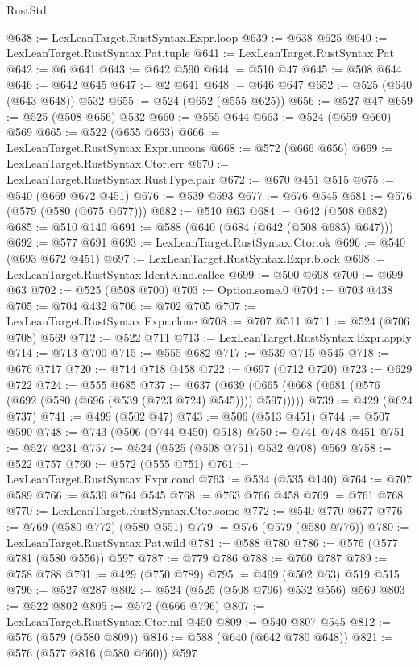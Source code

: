 \begin{lexlean}{RustStd}
\begin{coremodule}
@638 := LexLeanTarget.RustSyntax.Expr.loop
@639 := @638 @625
@640 := LexLeanTarget.RustSyntax.Pat.tuple
@641 := LexLeanTarget.RustSyntax.Pat
@642 := @6 @641
@643 := @642 @590
@644 := @510 @47
@645 := @508 @644
@646 := @642 @645
@647 := @2 @641
@648 := @646 @647
@652 := @525 (@640 (@643 @648)) @532
@655 := @524 (@652 (@555 @625))
@656 := @527 @47
@659 := @525 (@508 @656) @532
@660 := @555 @644
@663 := @524 (@659 @660) @569
@665 := @522 (@655 @663)
@666 := LexLeanTarget.RustSyntax.Expr.uncons
@668 := @572 (@666 @656)
@669 := LexLeanTarget.RustSyntax.Ctor.err
@670 := LexLeanTarget.RustSyntax.RustType.pair
@672 := @670 @451 @515
@675 := @540 (@669 @672 @451)
@676 := @539 @593
@677 := @676 @545
@681 := @576 (@579 (@580 (@675 @677)))
@682 := @510 @63
@684 := @642 (@508 @682)
@685 := @510 @140
@691 := @588 (@640 (@684 (@642 (@508 @685) @647)))
@692 := @577 @691
@693 := LexLeanTarget.RustSyntax.Ctor.ok
@696 := @540 (@693 @672 @451)
@697 := LexLeanTarget.RustSyntax.Expr.block
@698 := LexLeanTarget.RustSyntax.IdentKind.callee
@699 := @500 @698
@700 := @699 @63
@702 := @525 (@508 @700)
@703 := Option.some.{0}
@704 := @703 @438
@705 := @704 @432
@706 := @702 @705
@707 := LexLeanTarget.RustSyntax.Expr.clone
@708 := @707 @511
@711 := @524 (@706 @708) @569
@712 := @522 @711
@713 := LexLeanTarget.RustSyntax.Expr.apply
@714 := @713 @700
@715 := @555 @682
@717 := @539 @715 @545
@718 := @676 @717
@720 := @714 @718 @458
@722 := @697 (@712 @720)
@723 := @629 @722
@724 := @555 @685
@737 := @637 (@639 (@665 (@668 (@681 (@576 (@692 (@580 (@696 (@539 (@723 @724) @545)))) @597)))))
@739 := @429 (@624 @737)
@741 := @499 (@502 @47)
@743 := @506 (@513 @451)
@744 := @507 @590
@748 := @743 (@506 (@744 @450) @518)
@750 := @741 @748 @451
@751 := @527 @231
@757 := @524 (@525 (@508 @751) @532 @708) @569
@758 := @522 @757
@760 := @572 (@555 @751)
@761 := LexLeanTarget.RustSyntax.Expr.cond
@763 := @534 (@535 @140)
@764 := @707 @589
@766 := @539 @764 @545
@768 := @763 @766 @458
@769 := @761 @768
@770 := LexLeanTarget.RustSyntax.Ctor.some
@772 := @540 @770 @677
@776 := @769 (@580 @772) (@580 @551)
@779 := @576 (@579 (@580 @776))
@780 := LexLeanTarget.RustSyntax.Pat.wild
@781 := @588 @780
@786 := @576 (@577 @781 (@580 @556)) @597
@787 := @779 @786
@788 := @760 @787
@789 := @758 @788
@791 := @429 (@750 @789)
@795 := @499 (@502 @63) @519 @515
@796 := @527 @287
@802 := @524 (@525 (@508 @796) @532 @556) @569
@803 := @522 @802
@805 := @572 (@666 @796)
@807 := LexLeanTarget.RustSyntax.Ctor.nil @450
@809 := @540 @807 @545
@812 := @576 (@579 (@580 @809))
@816 := @588 (@640 (@642 @780 @648))
@821 := @576 (@577 @816 (@580 @660)) @597

\end{coremodule}
\end{lexlean}
